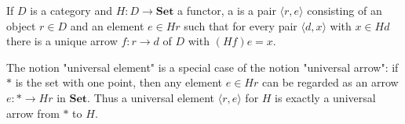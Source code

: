 If $D$ is a category and $H \colon D \to \mathbf{Set}$ a functor, a  is a pair $\langle r, e \rangle$ consisting of an object $r \in D$ and an element $e \in Hr$ such that for every pair $\langle d, x \rangle$ with $x \in Hd$ there is a unique arrow $f \colon r \to d$ of $D$ with $(Hf)e = x$.

The notion "universal element" is a special case of the notion "universal arrow": if $*$ is the set with one point, then any element $e \in Hr$ can be regarded as an arrow $e \colon * \to Hr$ in $\mathbf{Set}$. Thus a universal element $\langle r, e \rangle$ for $H$ is exactly a universal arrow from $*$ to $H$.
